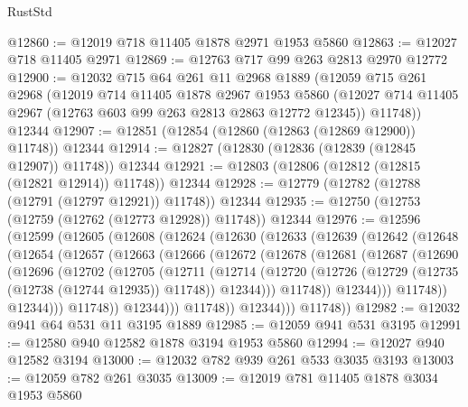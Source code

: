 \begin{lexlean}{RustStd}
\begin{coremodule}
{\begin{coremodule}
{{{{{{{{{{{{{{{{{{{{{{{{{{{{{@12860 := @12019 @718 @11405 @1878 @2971 @1953 @5860
@12863 := @12027 @718 @11405 @2971
@12869 := @12763 @717 @99 @263 @2813 @2970 @12772
@12900 := @12032
    @715
    @64
    @261
    @11
    @2968
    @1889
    (@12059
      @715
      @261
      @2968
      (@12019
        @714
        @11405
        @1878
        @2967
        @1953
        @5860
        (@12027 @714 @11405 @2967 (@12763 @603 @99 @263 @2813 @2863 @12772 @12345))
        @11748))
    @12344
@12907 := @12851 (@12854 (@12860 (@12863 (@12869 @12900)) @11748)) @12344
@12914 := @12827 (@12830 (@12836 (@12839 (@12845 @12907)) @11748)) @12344
@12921 := @12803 (@12806 (@12812 (@12815 (@12821 @12914)) @11748)) @12344
@12928 := @12779 (@12782 (@12788 (@12791 (@12797 @12921)) @11748)) @12344
@12935 := @12750 (@12753 (@12759 (@12762 (@12773 @12928)) @11748)) @12344
@12976 := @12596
    (@12599
      (@12605
        (@12608
          (@12624
            (@12630
              (@12633
                (@12639
                  (@12642
                    (@12648
                      (@12654
                        (@12657
                          (@12663
                            (@12666
                              (@12672
                                (@12678
                                  (@12681
                                    (@12687
                                      (@12690
                                        (@12696
                                          (@12702
                                            (@12705
                                              (@12711
                                                (@12714
                                                  (@12720
                                                    (@12726
                                                      (@12729
                                                        (@12735 (@12738 (@12744 @12935)) @11748))
                                                      @12344)))
                                                @11748))
                                            @12344)))
                                      @11748))
                                  @12344)))
                            @11748))
                        @12344)))
                  @11748))
              @12344)))
        @11748))
@12982 := @12032 @941 @64 @531 @11 @3195 @1889
@12985 := @12059 @941 @531 @3195
@12991 := @12580 @940 @12582 @1878 @3194 @1953 @5860
@12994 := @12027 @940 @12582 @3194
@13000 := @12032 @782 @939 @261 @533 @3035 @3193
@13003 := @12059 @782 @261 @3035
@13009 := @12019 @781 @11405 @1878 @3034 @1953 @5860
}}}}}}}}}}}}}}}}}}}}}}}}}}}}}
\end{coremodule}}
\end{coremodule}
\end{lexlean}
